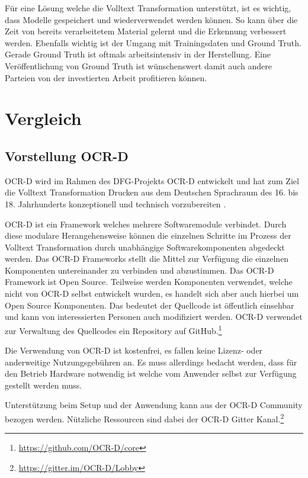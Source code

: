 \documentclass[a4paper,oneside, 12pt]{report}
\begin{document}
Für eine Lösung welche die Volltext Transformation unterstützt, ist es wichtig, dass Modelle gespeichert und wiederverwendet werden können. So kann über die Zeit von bereits verarbeitetem Material gelernt und die Erkennung verbessert werden. Ebenfalls wichtig ist der Umgang mit Trainingsdaten und Ground Truth. Gerade Ground Truth ist oftmals arbeitsintensiv in der Herstellung. Eine Veröffentlichung von Ground Truth ist wünschenswert damit auch andere Parteien von der investierten Arbeit profitieren können.

\chapter{Vergleich}\label{sec:vergleich}

\section{Vorstellung OCR-D}
OCR-D wird im Rahmen des DFG-Projekts OCR-D entwickelt und hat zum Ziel die Volltext Transformation Drucken aus dem Deutschen Sprachraum des 16. bis 18. Jahrhunderts konzeptionell und technisch vorzubereiten \cite{standOCR-D}. 

OCR-D ist ein Framework welches mehrere Softwaremodule verbindet. Durch diese modulare Herangehensweise können die einzelnen Schritte im Prozess der Volltext Transformation durch unabhängige Softwarekomponenten abgedeckt werden. Das OCR-D Frameworks stellt die Mittel zur Verfügung die einzelnen Komponenten untereinander zu verbinden und abzustimmen. Das OCR-D Framework ist Open Source. Teilweise werden Komponenten verwendet, welche nicht von OCR-D selbst entwickelt wurden, es handelt sich aber auch hierbei um Open Source Komponenten. Das bedeutet der Quellcode ist öffentlich einsehbar und kann von interessierten Personen auch modifiziert werden. OCR-D verwendet zur Verwaltung des Quellcodes ein Repository auf GitHub.\footnote{\url{https://github.com/OCR-D/core}}

Die Verwendung von OCR-D ist kostenfrei, es fallen keine Lizenz- oder anderweitige Nutzungsgebühren an. Es muss allerdings bedacht werden, dass für den Betrieb Hardware notwendig ist welche vom Anwender selbst zur Verfügung gestellt werden muss. \cite{ocrdfaq}

Unterstützung beim Setup und der Anwendung kann aus der OCR-D Community bezogen werden. Nützliche Ressourcen sind dabei der OCR-D Gitter Kanal.\footnote{\url{https://gitter.im/OCR-D/Lobby}}
\end{document}
